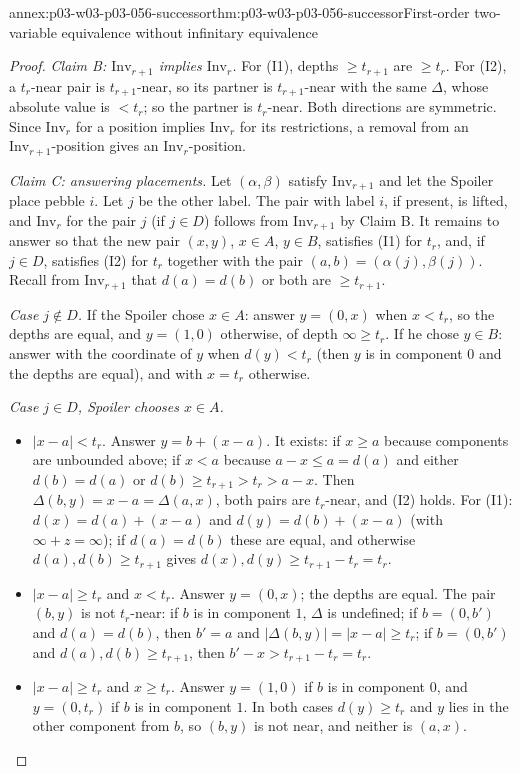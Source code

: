 \begin{annexitem}{annex:p03-w03-p03-056-successor}{thm:p03-w03-p03-056-successor}{First-order two-variable equivalence without infinitary equivalence}
\begin{proof}
\emph{Claim B: \(\mathrm{Inv}_{r+1}\) implies \(\mathrm{Inv}_r\).} For (I1),
depths \(\geq t_{r+1}\) are \(\geq t_r\). For (I2), a \(t_r\)-near pair is
\(t_{r+1}\)-near, so its partner is \(t_{r+1}\)-near with the same
\(\Delta\), whose absolute value is \(<t_r\); so the partner is
\(t_r\)-near. Both directions are symmetric. Since \(\mathrm{Inv}_r\) for a
position implies \(\mathrm{Inv}_r\) for its restrictions, a removal from an
\(\mathrm{Inv}_{r+1}\)-position gives an \(\mathrm{Inv}_r\)-position.

\emph{Claim C: answering placements.} Let \((\alpha,\beta)\) satisfy
\(\mathrm{Inv}_{r+1}\) and let the Spoiler place pebble \(i\). Let \(j\) be
the other label. The pair with label \(i\), if present, is lifted, and
\(\mathrm{Inv}_r\) for the pair \(j\) (if \(j\in D\)) follows from
\(\mathrm{Inv}_{r+1}\) by Claim B. It remains to answer so that the new pair
\((x,y)\), \(x\in A\), \(y\in B\), satisfies (I1) for \(t_r\), and, if
\(j\in D\), satisfies (I2) for \(t_r\) together with the pair
\((a,b)=(\alpha(j),\beta(j))\). Recall from \(\mathrm{Inv}_{r+1}\) that
\(d(a)=d(b)\) or both are \(\geq t_{r+1}\).

\emph{Case \(j\notin D\).} If the Spoiler chose \(x\in A\): answer
\(y=(0,x)\) when \(x<t_r\), so the depths are equal, and \(y=(1,0)\)
otherwise, of depth \(\infty\geq t_r\). If he chose \(y\in B\): answer with
the coordinate of \(y\) when \(d(y)<t_r\) (then \(y\) is in component \(0\)
and the depths are equal), and with \(x=t_r\) otherwise.

\emph{Case \(j\in D\), Spoiler chooses \(x\in A\).}
\begin{itemize}
\item \(\lvert x-a\rvert<t_r\). Answer \(y=b+(x-a)\). It exists: if
      \(x\geq a\) because components are unbounded above; if \(x<a\)
      because \(a-x\leq a=d(a)\) and either \(d(b)=d(a)\) or
      \(d(b)\geq t_{r+1}>t_r>a-x\). Then \(\Delta(b,y)=x-a=\Delta(a,x)\),
      both pairs are \(t_r\)-near, and (I2) holds. For (I1):
      \(d(x)=d(a)+(x-a)\) and \(d(y)=d(b)+(x-a)\) (with
      \(\infty+z=\infty\)); if \(d(a)=d(b)\) these are equal, and otherwise
      \(d(a),d(b)\geq t_{r+1}\) gives \(d(x),d(y)\geq t_{r+1}-t_r=t_r\).
\item \(\lvert x-a\rvert\geq t_r\) and \(x<t_r\). Answer \(y=(0,x)\); the
      depths are equal. The pair \((b,y)\) is not \(t_r\)-near: if \(b\) is
      in component \(1\), \(\Delta\) is undefined; if \(b=(0,b')\) and
      \(d(a)=d(b)\), then \(b'=a\) and \(\lvert\Delta(b,y)\rvert=
      \lvert x-a\rvert\geq t_r\); if \(b=(0,b')\) and
      \(d(a),d(b)\geq t_{r+1}\), then \(b'-x>t_{r+1}-t_r=t_r\).
\item \(\lvert x-a\rvert\geq t_r\) and \(x\geq t_r\). Answer \(y=(1,0)\) if
      \(b\) is in component \(0\), and \(y=(0,t_r)\) if \(b\) is in component
      \(1\). In both cases \(d(y)\geq t_r\) and \(y\) lies in the other
      component from \(b\), so \((b,y)\) is not near, and neither is
      \((a,x)\).
\end{itemize}


\end{proof}
\end{annexitem}
